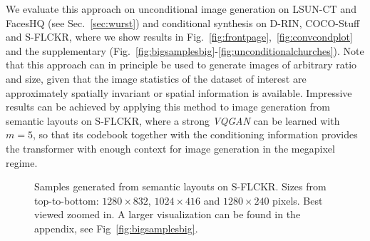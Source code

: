 We evaluate this approach on unconditional image generation on LSUN-CT and FacesHQ (see Sec.~\ref{sec:wurst}) and  conditional synthesis on D-RIN, COCO-Stuff and S-FLCKR, where we show results in
Fig.~\ref{fig:frontpage},~\ref{fig:convcondplot} and the supplementary (Fig.~\ref{fig:bigsamplesbig}-\ref{fig:unconditionalchurches}). Note that this approach can in principle be used to generate images of arbitrary ratio and size, given that the image statistics of the dataset of interest are approximately spatially invariant or spatial information is available. Impressive results can be achieved by applying this method to image generation from semantic layouts on S-FLCKR, where a strong \emph{VQGAN} can be learned with $m=5$, so that its codebook together with the conditioning information provides the transformer with enough context for image generation in the megapixel regime.

\begin{figure}
		\centering

  \caption{Samples generated from semantic layouts on S-FLCKR. Sizes from
    top-to-bottom: $1280 \times 832$, $1024 \times 416$ and $1280 \times 240$
    pixels. Best viewed zoomed in. A larger visualization can be found in the
    appendix, see Fig~\ref{fig:bigsamplesbig}.}
	\label{fig:bigsamples}
	\end{figure}


